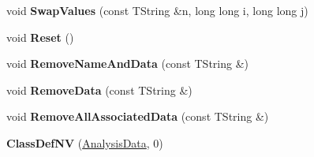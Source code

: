 \begin{DoxyCompactItemize}
\item 
\hypertarget{class_h_a_l_1_1_analysis_data_a44bfe71b3f3c88ce664e6d7b3bd9b111}{void {\bfseries Swap\+Values} (const T\+String \&n, long long i, long long j)}\label{class_h_a_l_1_1_analysis_data_a44bfe71b3f3c88ce664e6d7b3bd9b111}

\item 
\hypertarget{class_h_a_l_1_1_analysis_data_add418841a62be11aad64044e7eda5ffb}{void {\bfseries Reset} ()}\label{class_h_a_l_1_1_analysis_data_add418841a62be11aad64044e7eda5ffb}

\item 
\hypertarget{class_h_a_l_1_1_analysis_data_a39276ed7623a74cf6468fa9a69079e07}{void {\bfseries Remove\+Name\+And\+Data} (const T\+String \&)}\label{class_h_a_l_1_1_analysis_data_a39276ed7623a74cf6468fa9a69079e07}

\item 
\hypertarget{class_h_a_l_1_1_analysis_data_a35cbc682e6090bf2540ac62de07db82f}{void {\bfseries Remove\+Data} (const T\+String \&)}\label{class_h_a_l_1_1_analysis_data_a35cbc682e6090bf2540ac62de07db82f}

\item 
\hypertarget{class_h_a_l_1_1_analysis_data_a9e60f6b78b29280597ac991cf378f4f3}{void {\bfseries Remove\+All\+Associated\+Data} (const T\+String \&)}\label{class_h_a_l_1_1_analysis_data_a9e60f6b78b29280597ac991cf378f4f3}

\item 
\hypertarget{class_h_a_l_1_1_analysis_data_a0d63364d678190ac69e46922ad445b8a}{{\bfseries Class\+Def\+N\+V} (\hyperlink{class_h_a_l_1_1_analysis_data}{Analysis\+Data}, 0)}\label{class_h_a_l_1_1_analysis_data_a0d63364d678190ac69e46922ad445b8a}

\end{DoxyCompactItemize}
